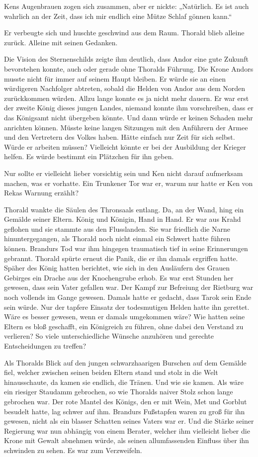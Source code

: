 Kens Augenbrauen zogen sich zusammen, aber er nickte: „Natürlich. Es ist auch wahrlich an der Zeit, dass ich mir endlich eine Mütze Schlaf gönnen kann.“

Er verbeugte sich und huschte geschwind aus dem Raum. Thorald blieb alleine zurück. Alleine mit seinen Gedanken.

Die Vision des Sternenschilds zeigte ihm deutlich, dass Andor eine gute Zukunft bevorstehen konnte, auch oder gerade ohne Thoralds Führung. Die Krone Andors musste nicht für immer auf seinem Haupt bleiben. Er würde sie an einen würdigeren Nachfolger abtreten, sobald die Helden von Andor aus dem Norden zurückkommen würden. Allzu lange konnte es ja nicht mehr dauern. Er war erst der zweite König dieses jungen Landes, niemand konnte ihm vorschreiben, dass er das Königsamt nicht übergeben könnte. Und dann würde er keinen Schaden mehr anrichten können. Müsste keine langen Sitzungen mit den Anführern der Armee und den Vertretern des Volkes haben. Hätte einfach nur Zeit für sich selbst. Würde er arbeiten müssen? Vielleicht könnte er bei der Ausbildung der Krieger helfen. Es würde bestimmt ein Plätzchen für ihn geben.

Nur sollte er vielleicht lieber vorsichtig sein und Ken nicht darauf aufmerksam machen, was er vorhatte. Ein Trunkener Tor war er, warum nur hatte er Ken von Rekas Warnung erzählt?

Thorald wankte die Säulen des Thronsaals entlang. Da, an der Wand, hing ein Gemälde seiner Eltern. König und Königin, Hand in Hand. Er war aus Krahd geflohen und sie stammte aus den Flusslanden. Sie war friedlich die Narne hinuntergegangen, als Thorald noch nicht einmal ein Schwert hatte führen können. Brandurs Tod war ihm hingegen traumatisch tief in seine Erinnerungen gebrannt. Thorald spürte erneut die Panik, die er ihn damals ergriffen hatte. Späher des König hatten berichtet, wie sich in den Ausläufern des Grauen Gebirges ein Drache aus der Knochengrube erhob. Es war erst Stunden her gewesen, dass sein Vater gefallen war. Der Kampf zur Befreiung der Rietburg war noch vollends im Gange gewesen. Damals hatte er gedacht, dass Tarok sein Ende sein würde. Nur der tapfere Einsatz der todesmutigen Helden hatte ihn gerettet. Wäre es besser gewesen, wenn er damals umgekommen wäre? Wie hatten seine Eltern es bloß geschafft, ein Königreich zu führen, ohne dabei den Verstand zu verlieren? So viele unterschiedliche Wünsche anzuhören und gerechte Entscheidungen zu treffen?

Als Thoralds Blick auf den jungen schwarzhaarigen Burschen auf dem Gemälde fiel, welcher zwischen seinen beiden Eltern stand und stolz in die Welt hinausschaute, da kamen sie endlich, die Tränen. Und wie sie kamen. Als wäre ein riesiger Staudamm gebrochen, so wie Thoralds naiver Stolz schon lange gebrochen war. Der rote Mantel des Königs, den er mit Wein, Met und Gorblut besudelt hatte, lag schwer auf ihm. Brandurs Fußstapfen waren zu groß für ihn gewesen, nicht als ein blasser Schatten seines Vaters war er. Und die Stärke seiner Regierung war nun abhängig von einem Berater, welcher ihm vielleicht lieber die Krone mit Gewalt abnehmen würde, als seinen allumfassenden Einfluss über ihn schwinden zu sehen. Es war zum Verzweifeln.

